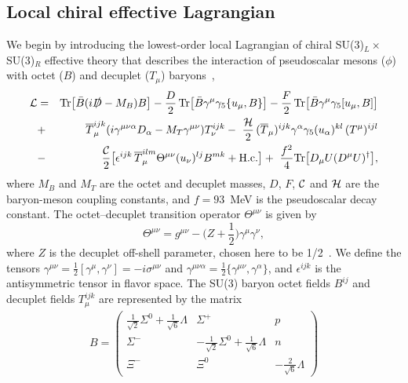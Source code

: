 \documentclass[preprintnumbers,prd,superscriptaddress,preprint]{revtex4-1}
\begin{document}
\subsection{Local chiral effective Lagrangian}
\label{ssec.chirallag}

We begin by introducing the lowest-order local Lagrangian of chiral SU(3)$_L\times$SU(3)$_R$ effective theory that describes the interaction of pseudoscalar mesons ($\phi$) with octet ($B$) and decuplet ($T_\mu$) baryons~\cite{Jenkins:1991ts, Ledwig:2014rfa}, \\
%
\begin{eqnarray}
\label{eq:ch8}
{\cal L}
&=& {\rm Tr} \big[ \bar B (i\slashed{D} - M_B) B \big]
 -  \frac{D}{2} \, {\rm Tr} \big[ \bar B \gamma^\mu \gamma_5 \{u_\mu, B\} \big]
 -  \frac{F}{2}\, {\rm Tr} \big[ \bar B \gamma^\mu \gamma_5 [ u_\mu ,B ] \big]
\nonumber\\
&+& \overline{T}_\mu^{ijk}
   (i\gamma^{\mu \nu \alpha} D_\alpha - M_T \gamma^{\mu\nu}) T_\nu^{ijk}
 -\ \frac{{\cal H}}{2}\,
(\overline{T}_\mu)^{ijk} \gamma^{\alpha} \gamma_5 (u_\alpha)^{kl}\,
	      (T^\mu)^{ijl}
\nonumber\\
&-& \frac{{\cal C}}{2}
   \big[ \epsilon^{ijk}\, \overline{T}_\mu^{ilm}
	  \Theta^{\mu\nu} (u_\nu)^{lj} B^{mk} + {\rm H.c.}
   \big]
 +\ \frac{f^2}{4}
    {\rm Tr} \big[ D_\mu U (D^\mu U)^\dag \big],
\end{eqnarray}
%
where $M_B$ and $M_T$ are the octet and decuplet masses, $D$, $F$, $\cal C$ and $\cal H$ are the baryon-meson coupling constants, and $f=93$~MeV is the pseudoscalar decay constant.
%
The octet–decuplet transition operator $\Theta^{\mu\nu}$ is given by
%
\begin{equation}
\Theta^{\mu\nu}
= g^{\mu\nu} - \Big(Z+\frac12\Big) \gamma^\mu \gamma^\nu,
\label{eq:Theta}
\end{equation}
%
where $Z$ is the decuplet off-shell parameter, chosen here to be 1/2~\cite{Nath:1971wp}.
We define the tensors
  $\gamma^{\mu\nu}
   = \frac{1}{2} [\gamma^\mu,\gamma^\nu] = -i \sigma^{\mu\nu}$
and
  $\gamma^{\mu\nu\alpha}
   = \frac{1}{2} \{\gamma ^{\mu\nu}, \gamma^\alpha\}$,
and $\epsilon^{ijk}$ is the antisymmetric tensor in
flavor space.
%
The SU(3) baryon octet fields $B^{ij}$ and decuplet fields $T^{ijk}_\mu$ are represented by the matrix
%
\begin{eqnarray}
\label{e.B}
B =
\left(
\begin{array}{ccc}
  \frac{1}{\sqrt 2} \Sigma^0 + \frac{1}{\sqrt 6} \Lambda
& \Sigma^+
& p					\\
  \Sigma^-
&-\frac{1}{\sqrt 2} \Sigma^0 + \frac{1}{\sqrt 6} \Lambda
& n					\\
%
  \Xi^-
& \Xi^0
&-\frac{2}{\sqrt6} \Lambda
\end{array}
\right)
\end{eqnarray}
\end{document}
